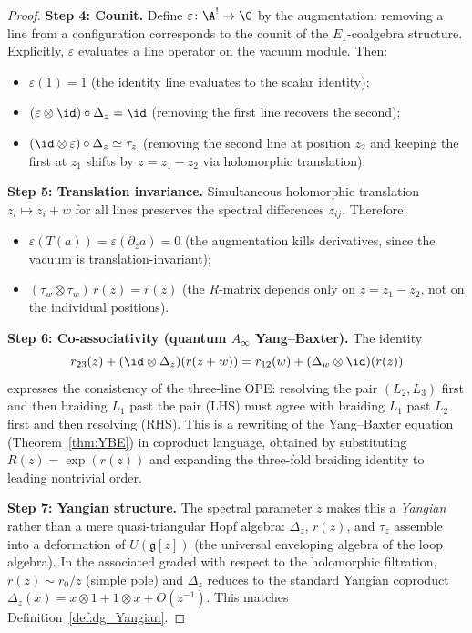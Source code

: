 \begin{proof}
\medskip
\noindent\textbf{Step 4: Counit.}
Define $\varepsilon \colon \A^! \to \C$ by the augmentation: removing a line from a configuration corresponds to the counit of the $E_1$-coalgebra structure. Explicitly, $\varepsilon$ evaluates a line operator on the vacuum module. Then:
\begin{itemize}
\item $\varepsilon(1) = 1$ (the identity line evaluates to the scalar identity);
\item $(\varepsilon \otimes \id) \circ \Delta_z = \id$ (removing the first line recovers the second);
\item $(\id \otimes \varepsilon) \circ \Delta_z \simeq \tau_z$ (removing the second line at position $z_2$ and keeping the first at $z_1$ shifts by $z = z_1 - z_2$ via holomorphic translation).
\end{itemize}

\medskip
\noindent\textbf{Step 5: Translation invariance.}
Simultaneous holomorphic translation $z_i \mapsto z_i + w$ for all lines preserves the spectral differences $z_{ij}$. Therefore:
\begin{itemize}
\item $\varepsilon(T(a)) = \varepsilon(\partial_z a) = 0$ (the augmentation kills derivatives, since the vacuum is translation-invariant);
\item $(\tau_w \otimes \tau_w)\, r(z) = r(z)$ (the $R$-matrix depends only on $z = z_1 - z_2$, not on the individual positions).
\end{itemize}

\medskip
\noindent\textbf{Step 6: Co-associativity (quantum $A_\infty$ Yang--Baxter).}
The identity
\[
r_{23}(z) + (\id \otimes \Delta_z)(r(z+w)) = r_{12}(w) + (\Delta_w \otimes \id)(r(z))
\]
expresses the consistency of the three-line OPE: resolving the pair $(L_2, L_3)$ first and then braiding $L_1$ past the pair (LHS) must agree with braiding $L_1$ past $L_2$ first and then resolving (RHS). This is a rewriting of the Yang--Baxter equation (Theorem~\ref{thm:YBE}) in coproduct language, obtained by substituting $R(z) = \exp(r(z))$ and expanding the three-fold braiding identity to leading nontrivial order.

\medskip
\noindent\textbf{Step 7: Yangian structure.}
The spectral parameter $z$ makes this a \emph{Yangian} rather than a mere quasi-triangular Hopf algebra: $\Delta_z$, $r(z)$, and $\tau_z$ assemble into a deformation of $U(\mathfrak{g}[z])$ (the universal enveloping algebra of the loop algebra). In the associated graded with respect to the holomorphic filtration, $r(z) \sim r_0/z$ (simple pole) and $\Delta_z$ reduces to the standard Yangian coproduct $\Delta_z(x) = x \otimes 1 + 1 \otimes x + O(z^{-1})$. This matches Definition~\ref{def:dg_Yangian}.
\end{proof}

